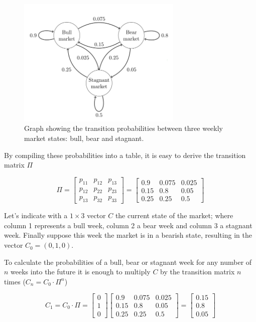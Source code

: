 \begin{figure}[htb]
\centering
\includegraphics[width=0.7\textwidth]{figures/markov_chain}
\caption{Graph showing the transition probabilities between three weekly market states: bull, bear and stagnant.}
\label{fig:markov_chain}
\end{figure}

By compiling these probabilities into a table, it is easy to derive the transition matrix $\Pi$

\[\Pi = 
\begin{bmatrix}
p_{11} & p_{12} & p_{13} \\
p_{12} & p_{22} & p_{23} \\
p_{13} & p_{32} & p_{33}
\end{bmatrix} =
\begin{bmatrix}
0.9 & 0.075 & 0.025 \\
0.15 & 0.8 & 0.05 \\
0.25 & 0.25 & 0.5
\end{bmatrix} 
\]

Let's indicate with a $1 \times 3$ vector $C$ the current state of the market; where column 1 represents a bull week, column 2 a bear week and column 3 a stagnant week. Finally suppose this week the market is in a bearish state, resulting in the vector $C_0  = (0, 1, 0)$.

To calculate the probabilities of a bull, bear or stagnant week for any number of $n$ weeks into the future it is enough to multiply $C$ by the transition matrix $n$ times ($C_n = C_0\cdot \Pi^n$)

\[C_1 = C_0 \cdot \Pi =  
\begin{bmatrix}
0 \\
1 \\
0 
\end{bmatrix}
\begin{bmatrix}
0.9 & 0.075 & 0.025 \\
0.15 & 0.8 & 0.05 \\
0.25 & 0.25 & 0.5
\end{bmatrix} = 
\begin{bmatrix}
0.15 \\
0.8 \\
0.05 
\end{bmatrix}
\]

